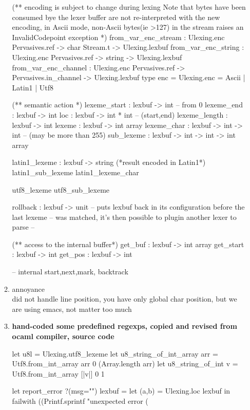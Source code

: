 \begin{enumerate}
\begin{enumerate}
\begin{bluecode}
(** encoding is subject to change during lexing Note that bytes
have been consumed bye the lexer buffer are not re-interpreted
with the new encoding, in Ascii mode, non-Ascii bytes(ie >127) in the
stream raises an InvalidCodepoint exception
*)
from_var_enc_stream :
    Ulexing.enc Pervasives.ref -> char Stream.t -> Ulexing.lexbuf
from_var_enc_string :
    Ulexing.enc Pervasives.ref -> string -> Ulexing.lexbuf
from_var_enc_channel :
    Ulexing.enc Pervasives.ref -> Pervasives.in_channel -> Ulexing.lexbuf
type enc = Ulexing.enc = Ascii | Latin1 | Utf8

(** semantic action  *)
lexeme_start : lexbuf -> int -- from 0
lexeme_end : lexbuf -> int
loc : lexbuf -> int * int -- (start,end)
lexeme_length : lexbuf -> int
lexeme : lexbuf -> int array
lexeme_char : lexbuf -> int -> int -- (may be more than 255)
sub_lexeme : lexbuf -> int -> int -> int array 

latin1_lexeme : lexbuf -> string (*result encoded in Latin1*)
latin1_sub_lexeme
latin1_lexeme_char

utf8_lexeme
utf8_sub_lexeme

rollback : lexbuf -> unit
-- puts lexbuf back in its configuration before the last lexeme
-- was matched, it's then possible to plugin another lexer to parse
-- 

(** access to the internal buffer*)
get_buf : lexbuf -> int array
get_start : lexbuf -> int
get_pos : lexbuf -> int


-- internal
start,next,mark, backtrack

\end{bluecode}

    
  \item annoyance \\
    did not handle line position, you have only global char position, but
    we are using emacs, not matter too much 
  \item \textbf{ hand-coded some predefined regexps, copied and revised from ocaml compiler,
      source code}

    

\begin{bluecode}
let u8l = Ulexing.utf8_lexeme 
let u8_string_of_int_array arr =
  Utf8.from_int_array arr 0 (Array.length arr)
let u8_string_of_int v =
  Utf8.from_int_array [|v|] 0 1 

let report_error ?(msg="") lexbuf  = 
  let (a,b) = Ulexing.loc lexbuf in 
  failwith ((Printf.sprintf "unexpected error (%


\end{bluecode}
\end{enumerate}
\end{enumerate}
